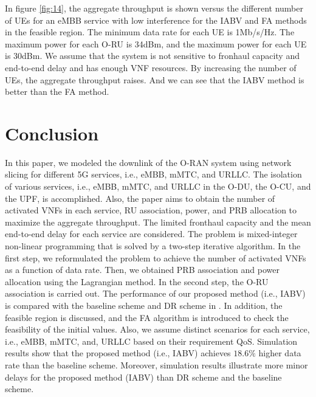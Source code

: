\documentclass[lettersize,journal]{IEEEtran}
\begin{document}
In figure \ref{fig:14}, the aggregate throughput is shown versus
the different number of UEs for an eMBB service with low interference for the IABV and FA methods in the feasible region.
The minimum data rate for each UE is 1Mb/s/Hz.
The maximum power for each O-RU is 34dBm, and the maximum power for each UE is 30dBm. We assume that the system is not sensitive to fronhaul capacity and end-to-end delay and has enough VNF resources.
By increasing the number of UEs, the aggregate throughput raises.
And we can see that the IABV method is better than the FA method.
\vspace*{-1.em}
\section{Conclusion}\label{conc}
In this  paper, we modeled the downlink of the O-RAN system using network slicing for different 5G services, i.e., eMBB, mMTC, and URLLC.
The isolation of various services, i.e., eMBB, mMTC, and URLLC in the O-DU, the O-CU, and the UPF, is accomplished.
Also, the paper aims to obtain the number of activated VNFs in each service, RU association, power, and PRB allocation to maximize the aggregate throughput. The limited fronthaul capacity and the mean end-to-end delay for each service are considered.
The problem is mixed-integer non-linear programming that is solved by a two-step iterative algorithm.
In the first step, we reformulated the problem to achieve the number of activated VNFs as a function of data rate. Then, we obtained PRB association and power allocation using the Lagrangian method.
In the second step, the O-RU association is carried out.
The performance of our proposed method (i.e., IABV) is compared with the baseline scheme and DR scheme in \cite{lee2018dynamic}.
In addition, the feasible region is discussed, and the FA algorithm is introduced to check the feasibility of the initial values.
Also, we assume distinct scenarios for each service, i.e., eMBB, mMTC, and, URLLC based on their requirement QoS.
Simulation results show that the proposed method (i.e., IABV) achieves $18.6\%$ higher data rate than the baseline scheme.
Moreover, simulation results illustrate more minor delays for the proposed method (IABV) than DR scheme and the baseline scheme.
\vspace*{-0.7em}


\end{document}
